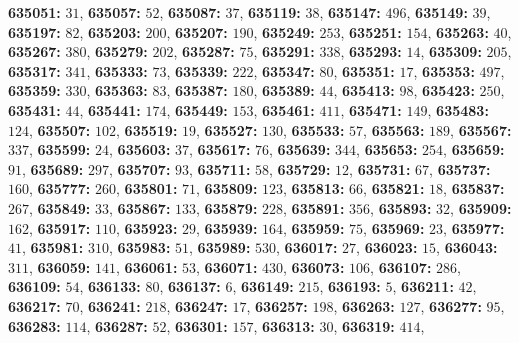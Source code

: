 \textsf{\bfseries 635051:} $31$, \textsf{\bfseries 635057:} $52$, \textsf{\bfseries 635087:} $37$, \textsf{\bfseries 635119:} $38$, \textsf{\bfseries 635147:} $496$, \textsf{\bfseries 635149:} $39$, \textsf{\bfseries 635197:} $82$, \textsf{\bfseries 635203:} $200$, \textsf{\bfseries 635207:} $190$, \textsf{\bfseries 635249:} $253$, \textsf{\bfseries 635251:} $154$, \textsf{\bfseries 635263:} $40$, \textsf{\bfseries 635267:} $380$, \textsf{\bfseries 635279:} $202$, \textsf{\bfseries 635287:} $75$, \textsf{\bfseries 635291:} $338$, \textsf{\bfseries 635293:} $14$, \textsf{\bfseries 635309:} $205$, \textsf{\bfseries 635317:} $341$, \textsf{\bfseries 635333:} $73$, \textsf{\bfseries 635339:} $222$, \textsf{\bfseries 635347:} $80$, \textsf{\bfseries 635351:} $17$, \textsf{\bfseries 635353:} $497$, \textsf{\bfseries 635359:} $330$, \textsf{\bfseries 635363:} $83$, \textsf{\bfseries 635387:} $180$, \textsf{\bfseries 635389:} $44$, \textsf{\bfseries 635413:} $98$, \textsf{\bfseries 635423:} $250$, \textsf{\bfseries 635431:} $44$, \textsf{\bfseries 635441:} $174$, \textsf{\bfseries 635449:} $153$, \textsf{\bfseries 635461:} $411$, \textsf{\bfseries 635471:} $149$, \textsf{\bfseries 635483:} $124$, \textsf{\bfseries 635507:} $102$, \textsf{\bfseries 635519:} $19$, \textsf{\bfseries 635527:} $130$, \textsf{\bfseries 635533:} $57$, \textsf{\bfseries 635563:} $189$, \textsf{\bfseries 635567:} $337$, \textsf{\bfseries 635599:} $24$, \textsf{\bfseries 635603:} $37$, \textsf{\bfseries 635617:} $76$, \textsf{\bfseries 635639:} $344$, \textsf{\bfseries 635653:} $254$, \textsf{\bfseries 635659:} $91$, \textsf{\bfseries 635689:} $297$, \textsf{\bfseries 635707:} $93$, \textsf{\bfseries 635711:} $58$, \textsf{\bfseries 635729:} $12$, \textsf{\bfseries 635731:} $67$, \textsf{\bfseries 635737:} $160$, \textsf{\bfseries 635777:} $260$, \textsf{\bfseries 635801:} $71$, \textsf{\bfseries 635809:} $123$, \textsf{\bfseries 635813:} $66$, \textsf{\bfseries 635821:} $18$, \textsf{\bfseries 635837:} $267$, \textsf{\bfseries 635849:} $33$, \textsf{\bfseries 635867:} $133$, \textsf{\bfseries 635879:} $228$, \textsf{\bfseries 635891:} $356$, \textsf{\bfseries 635893:} $32$, \textsf{\bfseries 635909:} $162$, \textsf{\bfseries 635917:} $110$, \textsf{\bfseries 635923:} $29$, \textsf{\bfseries 635939:} $164$, \textsf{\bfseries 635959:} $75$, \textsf{\bfseries 635969:} $23$, \textsf{\bfseries 635977:} $41$, \textsf{\bfseries 635981:} $310$, \textsf{\bfseries 635983:} $51$, \textsf{\bfseries 635989:} $530$, \textsf{\bfseries 636017:} $27$, \textsf{\bfseries 636023:} $15$, \textsf{\bfseries 636043:} $311$, \textsf{\bfseries 636059:} $141$, \textsf{\bfseries 636061:} $53$, \textsf{\bfseries 636071:} $430$, \textsf{\bfseries 636073:} $106$, \textsf{\bfseries 636107:} $286$, \textsf{\bfseries 636109:} $54$, \textsf{\bfseries 636133:} $80$, \textsf{\bfseries 636137:} $6$, \textsf{\bfseries 636149:} $215$, \textsf{\bfseries 636193:} $5$, \textsf{\bfseries 636211:} $42$, \textsf{\bfseries 636217:} $70$, \textsf{\bfseries 636241:} $218$, \textsf{\bfseries 636247:} $17$, \textsf{\bfseries 636257:} $198$, \textsf{\bfseries 636263:} $127$, \textsf{\bfseries 636277:} $95$, \textsf{\bfseries 636283:} $114$, \textsf{\bfseries 636287:} $52$, \textsf{\bfseries 636301:} $157$, \textsf{\bfseries 636313:} $30$, \textsf{\bfseries 636319:} $414$, 

